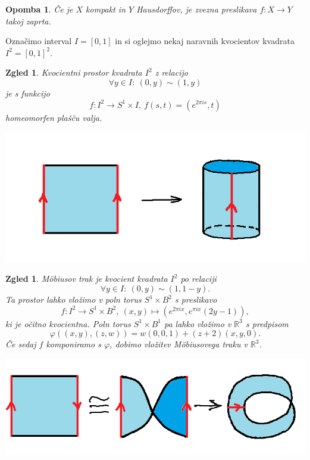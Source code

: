 \documentclass[10pt, a4paper]{article}
\newtheorem*{opomba}{Opomba}
\newtheorem{zgled}[izr]{Zgled}
\newcommand{\R}{\mathbb {R}}
\begin{document}
\begin{opomba}
  Če je $X$ kompakt in $Y$ Hausdorffov, je zvezna preslikava $f: X \to Y$ takoj zaprta.
\end{opomba}

Označimo interval $I = [0, 1]$ in si oglejmo nekaj naravnih kvocientov kvadrata $I^2 = [0, 1]^2$.

\begin{zgled}
  Kvocientni prostor kvadrata $I^2$ z relacijo 
    $$\forall y \in I:\ (0, y) \sim (1, y)$$ je s funkcijo $$f: I^2 \to S^1 \times I,\ f(s, t) = (e^{2 \pi i s}, t)$$
    homeomorfen plašču valja.
    \begin{center}
      \includegraphics[scale=0.7]{zgled1.png}
    \end{center}
\end{zgled}

\begin{zgled}
  Möbiusov trak je kvocient kvadrata $I^2$ po relaciji $$\forall y \in I:\ (0, y) \sim (1, 1 - y).$$
  Ta prostor lahko vložimo v poln torus $S^1 \times B^2$ s preslikavo 
  $$f: I^2 \to S^1 \times B^2,\ (x, y) \mapsto (e^{2\pi i x}, e^{\pi i x} (2y - 1)),$$
  ki je očitno kvocientna.
  Poln torus $S^1 \times B^1$ pa lahko vložimo v $\R^3$ s predpisom 
  $$\varphi((x, y), (z, w)) = w(0, 0, 1) + (z + 2)(x, y, 0).$$
  Če sedaj $f$ komponiramo s $\varphi$, dobimo vložitev Möbiusovega traku 
  v $\R^3$.
  \begin{center}
    \includegraphics[scale=0.5]{zgled2.png}
  \end{center}
\end{zgled}
\end{document}
